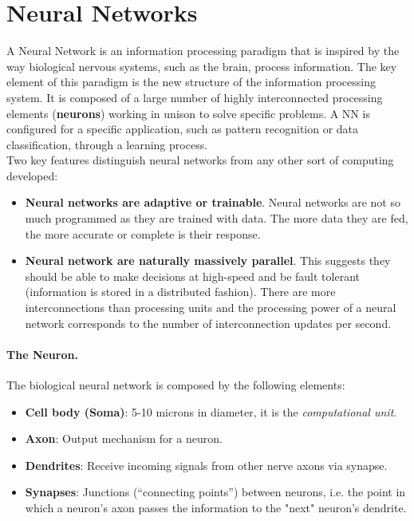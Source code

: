 \section{Neural Networks}
A Neural Network is an information processing paradigm that is inspired by the way biological nervous systems, such as the brain, process information. The key element of this paradigm is the new structure of the information processing system. It is composed of a large number of highly interconnected processing elements (\textbf{neurons}) working in unison to solve specific problems. A NN is configured for a specific application, such as pattern recognition or data classification, through a learning process.\\
Two key features distinguish neural networks from any other sort of computing developed:
\begin{itemize}
	\item \textbf{Neural networks are adaptive or trainable}. Neural networks are not so much programmed as they are trained with data. The more data they are fed, the more accurate or complete is their response.
	\item \textbf{Neural network are naturally massively parallel}. This suggests they should be able to make decisions at high-speed and be fault tolerant (information is stored in a distributed fashion). There are more interconnections than processing units and the processing power of a neural network corresponds to the number of interconnection updates per second. 
\end{itemize}

\paragraph*{The Neuron.} The biological neural network is composed by the following elements:
\begin{itemize}
	\item \textbf{Cell body (Soma)}: 5-10 microns in diameter, it is the \textit{computational unit}.
	\item \textbf{Axon}: Output mechanism for a neuron.
	\item \textbf{Dendrites}: Receive incoming signals from other nerve axons via synapse.
	\item \textbf{Synapses}: Junctions (``connecting points'') between neurons, i.e. the point in which a neuron's axon passes the information to the "next" neuron's dendrite.
\end{itemize}

